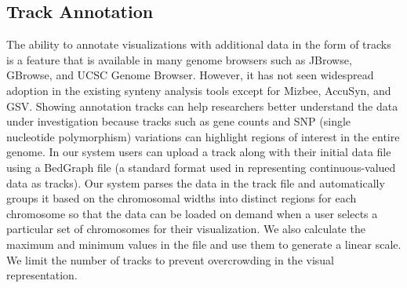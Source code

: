 \subsection{Track Annotation}
The ability to annotate visualizations with additional data in the form of tracks is a feature that is available in many genome browsers such as JBrowse, GBrowse, and UCSC Genome Browser\cite{skinner2009jbrowse,donlin2009using,karolchik2003ucsc}. However, it has not seen widespread adoption in the existing synteny analysis tools except for Mizbee,  AccuSyn, and GSV\cite{Meyer2009,accusyn,revanna2012web}. Showing annotation tracks can help researchers better understand the data under investigation because tracks such as gene counts and SNP (single nucleotide polymorphism) variations can highlight regions of interest in the entire genome. In our system users can upload a track along with their initial data file using a BedGraph file (a standard format used in representing continuous-valued data as tracks). Our system parses the data in the track file and automatically groups it based on the chromosomal widths into distinct regions for each chromosome so that the data can be loaded on demand when a user selects a particular set of chromosomes for their visualization. We also calculate the maximum and minimum values in the file and use them to generate a linear scale. We limit the number of tracks to prevent overcrowding in the visual representation.

